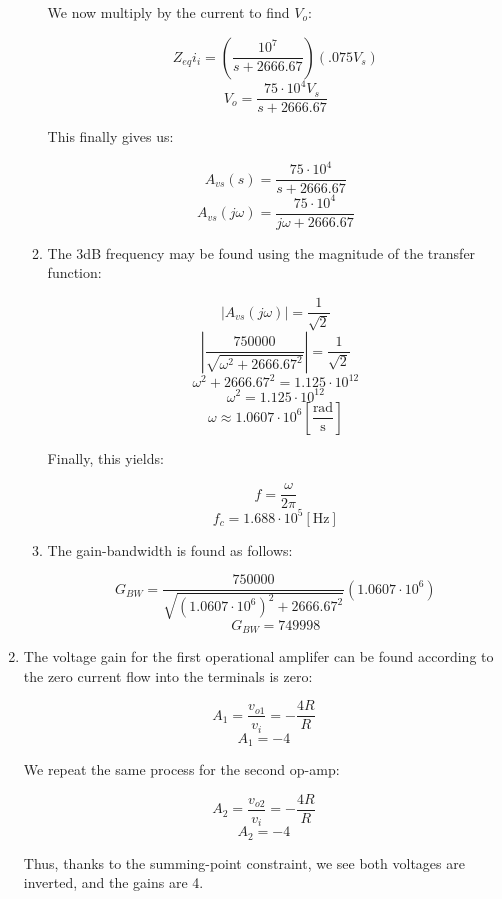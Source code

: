 \begin{enumerate}
\begin{enumerate}
        \begin{center}
          We now multiply by the current to find $V_o$:
        \end{center}
        $$Z_{eq}i_i=\left(\frac{10^7}{s+2666.67}\right)\left(  .075V_s\right)$$
        $$V_o=\frac{75\cdot10^4V_s}{s+2666.67}$$

        \begin{center}
          This finally gives us:
        \end{center}
        $$A_{vs}(s)=\frac{75\cdot10^4}{s+2666.67}$$
        $$\boxed{A_{vs}(j\omega)=\frac{75\cdot10^4}{j\omega+2666.67}}$$

      \item The 3dB frequency may be found using the magnitude of the transfer function:

        $$|A_{vs}(j\omega)|=\frac{1}{\sqrt{2}}$$
        $$|\frac{750000}{\sqrt{\omega^2+2666.67^2}}|=\frac{1}{\sqrt{2}}$$
        $$\omega^2+2666.67^2=1.125\cdot10^{12}$$
        $$\omega^2=1.125\cdot10^{12}$$
        $$\omega\approx1.0607\cdot10^{6}\left[ \frac{\text{rad}}{\si{\second}} \right]$$

        \begin{center}
          Finally, this yields:
        \end{center}
        $$f=\frac{\omega}{2\pi}$$
        $$\boxed{f_c=1.688\cdot10^5[\si{\hertz}]}$$

      \item The gain-bandwidth is found as follows:

        $$G_{BW}=\frac{750000}{\sqrt{(1.0607\cdot10^6)^2+2666.67^2}}(1.0607\cdot10^6)$$
        $$\boxed{G_{BW}=749998}$$

    \end{enumerate}

  \item The voltage gain for the first operational amplifer can be found according to the zero current flow into the terminals is zero:

    $$A_1=\frac{v_{o1}}{v_i}=-\frac{4R}{R}$$
    $$\boxed{A_1=-4}$$

    \begin{center}
      We repeat the same process for the second op-amp:
    \end{center}
    $$A_2=\frac{v_{o2}}{v_i}=-\frac{4R}{R}$$
    $$\boxed{A_2=-4}$$

    \begin{center}
      Thus, thanks to the summing-point constraint, we see both voltages are inverted, and the gains are 4.
    \end{center}

\end{enumerate}



